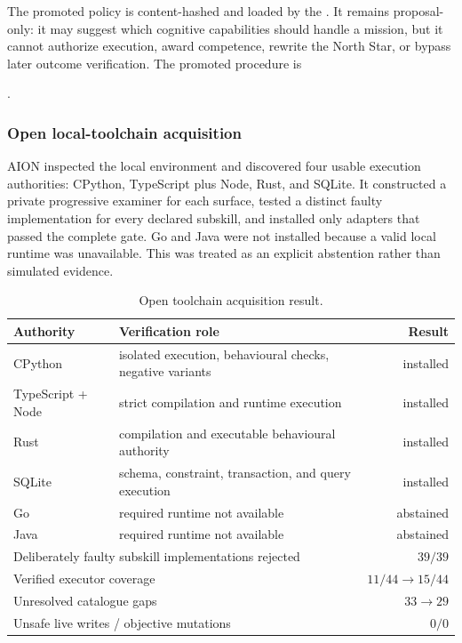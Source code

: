 The promoted policy is content-hashed and loaded by the
.  It remains proposal-only: it may suggest
which cognitive capabilities should handle a mission, but it cannot authorize
execution, award competence, rewrite the North Star, or bypass later outcome
verification.  The promoted procedure is
\begin{center}
\small{}.
\end{center}

\subsubsection{Open local-toolchain acquisition}

AION inspected the local environment and discovered four usable execution
authorities: CPython, TypeScript plus Node, Rust, and SQLite.  It constructed a
private progressive examiner for each surface, tested a distinct faulty
implementation for every declared subskill, and installed only adapters that
passed the complete gate.  Go and Java were not installed because a valid local
runtime was unavailable.  This was treated as an explicit abstention rather
than simulated evidence.

\begin{table}[htbp]
\centering
\caption{Open toolchain acquisition result.}
\label{tab:aion-open-toolchain-acquisition}
\begin{tabularx}{\textwidth}{@{}lXr@{}}
\toprule
Authority & Verification role & Result \\
\midrule
CPython & isolated execution, behavioural checks, negative variants & installed \\
TypeScript + Node & strict compilation and runtime execution & installed \\
Rust & compilation and executable behavioural authority & installed \\
SQLite & schema, constraint, transaction, and query execution & installed \\
Go & required runtime not available & abstained \\
Java & required runtime not available & abstained \\
\midrule
\multicolumn{2}{l}{Deliberately faulty subskill implementations rejected} & $39/39$ \\
\multicolumn{2}{l}{Verified executor coverage} & $11/44\rightarrow15/44$ \\
\multicolumn{2}{l}{Unresolved catalogue gaps} & $33\rightarrow29$ \\
\multicolumn{2}{l}{Unsafe live writes / objective mutations} & $0/0$ \\
\bottomrule
\end{tabularx}
\end{table}


